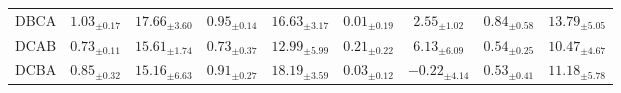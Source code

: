 \begin{table}[!t]
\begin{tabular*}{\textwidth}{@{\extracolsep{\fill}}lcccccccc}
DBCA & $1.03_{\pm0.17}$ & $17.66_{\pm3.60}$ & $0.95_{\pm0.14}$ & $16.63_{\pm3.17}$ & {\boldmath$0.01_{\pm0.19}$} & {\boldmath$2.55_{\pm1.02}$} & $0.84_{\pm0.58}$ & $13.79_{\pm5.05}$ \\
DCAB & $0.73_{\pm0.11}$ & $15.61_{\pm1.74}$ & $0.73_{\pm0.37}$ & $12.99_{\pm5.99}$ & {\boldmath$0.21_{\pm0.22}$} & $6.13_{\pm6.09}$ & $0.54_{\pm0.25}$ & $10.47_{\pm4.67}$ \\
DCBA & $0.85_{\pm0.32}$ & $15.16_{\pm6.63}$ & $0.91_{\pm0.27}$ & $18.19_{\pm3.59}$ & {\boldmath$0.03_{\pm0.12}$} & {\boldmath$-0.22_{\pm4.14}$} & $0.53_{\pm0.41}$ & $11.18_{\pm5.78}$ \\
\bottomrule
\end{tabular*}
\end{table}
